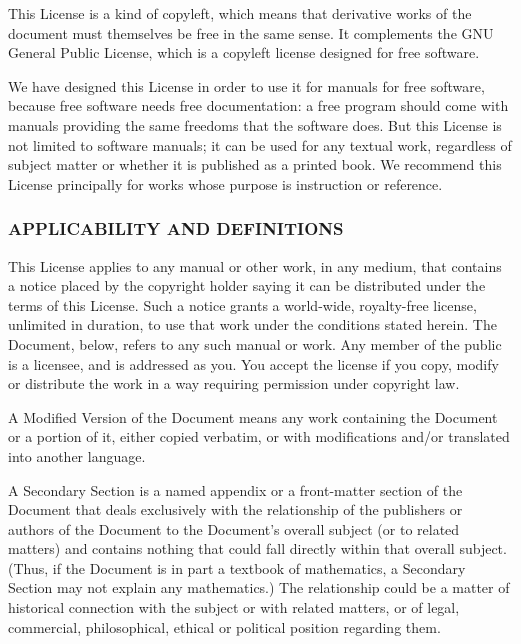 \documentclass[10pt,english]{article}
\begin{document}
This License is a kind of \textquotedbl{}copyleft\textquotedbl{},
which means that derivative works of the document must themselves
be free in the same sense. It complements the GNU General Public License,
which is a copyleft license designed for free software.

We have designed this License in order to use it for manuals for free
software, because free software needs free documentation: a free program
should come with manuals providing the same freedoms that the software
does. But this License is not limited to software manuals; it can
be used for any textual work, regardless of subject matter or whether
it is published as a printed book. We recommend this License principally
for works whose purpose is instruction or reference.


\subsubsection{APPLICABILITY AND DEFINITIONS\label{sub:APPLICABILITY-AND-DEFINITIONS}}

This License applies to any manual or other work, in any medium, that
contains a notice placed by the copyright holder saying it can be
distributed under the terms of this License. Such a notice grants
a world-wide, royalty-free license, unlimited in duration, to use
that work under the conditions stated herein. The \textquotedbl{}Document\textquotedbl{},
below, refers to any such manual or work. Any member of the public
is a licensee, and is addressed as \textquotedbl{}you\textquotedbl{}.
You accept the license if you copy, modify or distribute the work
in a way requiring permission under copyright law.

A \textquotedbl{}Modified Version\textquotedbl{} of the Document means
any work containing the Document or a portion of it, either copied
verbatim, or with modifications and/or translated into another language.

A \textquotedbl{}Secondary Section\textquotedbl{} is a named appendix
or a front-matter section of the Document that deals exclusively with
the relationship of the publishers or authors of the Document to the
Document's overall subject (or to related matters) and contains nothing
that could fall directly within that overall subject. (Thus, if the
Document is in part a textbook of mathematics, a Secondary Section
may not explain any mathematics.) The relationship could be a matter
of historical connection with the subject or with related matters,
or of legal, commercial, philosophical, ethical or political position
regarding them.
\end{document}
